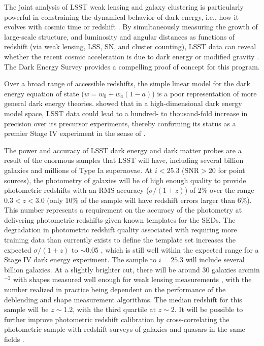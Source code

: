 The joint analysis of LSST weak lensing and galaxy clustering is
particularly powerful in constraining the dynamical behavior of dark
energy, i.e., how it evolves with cosmic time or redshift \citep{2004PhRvD..70D3009H,2006JCAP...08..008Z}.  By
simultaneously measuring the growth of large-scale structure, and
luminosity and angular distances as functions of redshift (via weak
lensing, LSS, SN, and cluster counting), LSST data can reveal whether
the recent cosmic acceleration is due to dark energy or modified
gravity \citep{2004PhRvD..69D4005L,2006PhRvD..74B3512K,2006PhRvD..74d3513I,2008PhRvD..78f3503J,2011PhRvD..83b3008O,2013ApJ...779...39J,2013PhR...530...87W}.
The Dark Energy Survey \citep[see e.g.,][and references therein]{2017arXiv170801530D} provides a compelling proof of concept for this program.

Over a broad range of accessible redshifts, the simple linear model
for the dark energy equation of state ($w = w_0 + w_a(1-a)$) is a poor representation of more
general dark energy theories. \citet{2008PhRvD..78d3528B} showed that in a high-dimensional dark energy model space,
LSST data could lead to a hundred- to thousand-fold increase in precision over its
precursor experiments, thereby confirming its status as
a premier Stage IV experiment in the sense of \citet{2006astro.ph..9591A}.

The power and accuracy of LSST dark energy and dark matter probes are
a result of the enormous samples that LSST will have, including
several billion galaxies and millions of Type Ia
supernovae. At $i < 25.3$ (SNR${}>20$ for point sources), the
photometry of galaxies will be of high enough quality to provide
photometric redshifts with an RMS accuracy ($\sigma/(1+z)$) of 2\%
over the range $0.3 < z < 3.0$ (only 10\% of the sample will have redshift errors larger than 6\%).
This number represents a requirement on the accuracy of the photometry at delivering photometric
redshifts given known templates for the SEDs.  The degradation in photometric redshift quality associated with
requiring more training data than currently exists to define the template set increases the
expected $\sigma/(1+z)$ to $\sim$0.05 \cite[e.g.][]{2015APh....63...81N,2018AJ....155....1G}, which is still well within the
expected range for a Stage IV dark energy experiment.  The
sample to $i=25.3$ will include several billion galaxies.  At a
slightly brighter cut, there will be around 30 galaxies arcmin$^{-2}$
with shapes measured well enough for weak lensing measurements \citep{2013MNRAS.434.2121C,2015MNRAS.447.1746C},
with the number realized in practice being dependent on
the performance of the deblending and shape measurement algorithms.
The median redshift for
this sample will be $z\sim$1.2, with the third quartile at $z\sim2$.
It will be possible to further improve photometric redshift calibration
by cross-correlating the photometric sample with redshift surveys of
galaxies and quasars in the same fields
\citep{2008ApJ...684...88N,2010ApJ...721..456M,2013arXiv1303.4722M,2017arXiv171002517D}.


